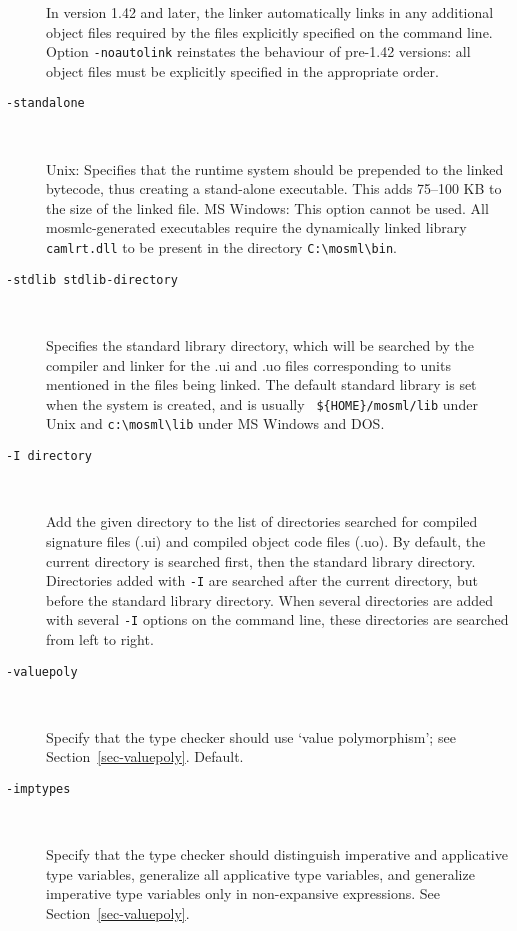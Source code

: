 \documentclass[fleqn]{article}
\begin{document}
\begin{description}
  In version 1.42 and later, the linker automatically links in any
  additional object files required by the files explicitly specified
  on the command line.  Option {\tt -noautolink} reinstates the
  behaviour of pre-1.42 versions: all object files must be explicitly
  specified in the appropriate order.

\item[{\tt -standalone}]\mbox{ }
  
  Unix: Specifies that the runtime system should be prepended to the
  linked bytecode, thus creating a stand-alone executable.  This adds
  75--100 KB to the size of the linked file.  MS Windows: This option
  cannot be used.  All mosmlc-generated executables require the
  dynamically linked library \texttt{camlrt.dll} to be present in the
  directory \verb+C:\mosml\bin+.

\item[{\tt -stdlib {\rm stdlib-directory}}]\mbox{ }

  Specifies the standard library directory, which will be searched by
  the compiler and linker for the .ui and .uo files corresponding to
  units mentioned in the files being linked.  The default standard
  library is set when the system is created, and is usually {\tt
    \$\{HOME\}/mosml/lib} under Unix and \verb#c:\mosml\lib# under MS
  Windows and DOS.

\item[{\tt -I {\rm directory}}]\mbox{ }

  Add the given directory to the list of directories searched for
  compiled signature files (.ui) and compiled object code files (.uo).
  By default, the current directory is searched first, then the
  standard library directory.  Directories added with {\tt -I} are
  searched after the current directory, but before the standard
  library directory.  When several directories are added with several
  {\tt -I} options on the command line, these directories are searched
  from left to right.

\item[{\tt -valuepoly}]\mbox{ }

  Specify that the type checker should use `value polymorphism'; see
  Section~\ref{sec-valuepoly}.  Default.

\item[{\tt -imptypes}]\mbox{ }

  Specify that the type checker should distinguish imperative and
  applicative type variables, generalize all applicative type
  variables, and generalize imperative type variables only in
  non-expansive expressions.  See Section~\ref{sec-valuepoly}.


\end{description}
\end{document}
